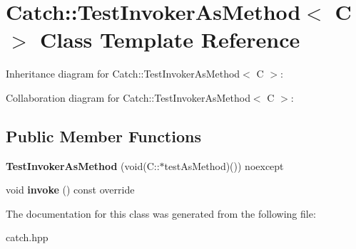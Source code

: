 \hypertarget{classCatch_1_1TestInvokerAsMethod}{}\section{Catch\+:\+:Test\+Invoker\+As\+Method$<$ C $>$ Class Template Reference}
\label{classCatch_1_1TestInvokerAsMethod}


Inheritance diagram for Catch\+:\+:Test\+Invoker\+As\+Method$<$ C $>$\+:


Collaboration diagram for Catch\+:\+:Test\+Invoker\+As\+Method$<$ C $>$\+:
\subsection*{Public Member Functions}
\begin{DoxyCompactItemize}
\item 
\mbox{\label{classCatch_1_1TestInvokerAsMethod_a119c4bdbbdd95c42859c18541987a1a4}} 
{\bfseries Test\+Invoker\+As\+Method} (void(C\+::$\ast$test\+As\+Method)()) noexcept
\item 
\mbox{\label{classCatch_1_1TestInvokerAsMethod_a8115a06efe273f4112ec0b5452c1b5f2}} 
void {\bfseries invoke} () const override
\end{DoxyCompactItemize}


The documentation for this class was generated from the following file\+:\begin{DoxyCompactItemize}
\item 
catch.\+hpp\end{DoxyCompactItemize}
